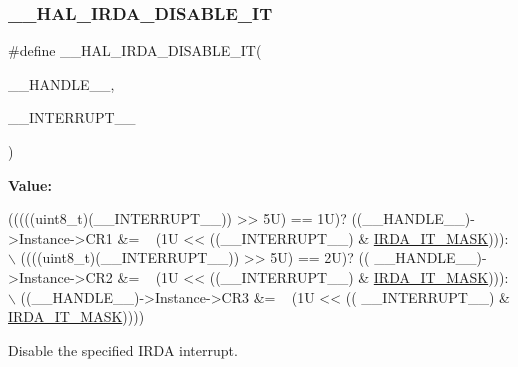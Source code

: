 \subsubsection{\texorpdfstring{\+\_\+\+\_\+\+H\+A\+L\+\_\+\+I\+R\+D\+A\+\_\+\+D\+I\+S\+A\+B\+L\+E\+\_\+\+IT}{\_\_HAL\_IRDA\_DISABLE\_IT}}
{\footnotesize\ttfamily \#define \+\_\+\+\_\+\+H\+A\+L\+\_\+\+I\+R\+D\+A\+\_\+\+D\+I\+S\+A\+B\+L\+E\+\_\+\+IT(\begin{DoxyParamCaption}\item[{}]{\+\_\+\+\_\+\+H\+A\+N\+D\+L\+E\+\_\+\+\_\+,  }\item[{}]{\+\_\+\+\_\+\+I\+N\+T\+E\+R\+R\+U\+P\+T\+\_\+\+\_\+ }\end{DoxyParamCaption})}

{\bfseries Value\+:}
\begin{DoxyCode}
(((((uint8\_t)(\_\_INTERRUPT\_\_)) >> 5U) == 1U)? ((\_\_HANDLE\_\_)->Instance->CR1 &= ~ (1U << ((\_\_INTERRUPT\_\_) & 
      \hyperlink{group___i_r_d_a___interruption___mask_ga38eeb904e4117f70c18bf3767c7ba4a6}{IRDA\_IT\_MASK}))): \(\backslash\)
                                                           ((((uint8\_t)(\_\_INTERRUPT\_\_)) >> 5U) == 2U)? ((
      \_\_HANDLE\_\_)->Instance->CR2 &= ~ (1U << ((\_\_INTERRUPT\_\_) & \hyperlink{group___i_r_d_a___interruption___mask_ga38eeb904e4117f70c18bf3767c7ba4a6}{IRDA\_IT\_MASK}))): \(\backslash\)
                                                           ((\_\_HANDLE\_\_)->Instance->CR3 &= ~ (1U << ((
      \_\_INTERRUPT\_\_) & \hyperlink{group___i_r_d_a___interruption___mask_ga38eeb904e4117f70c18bf3767c7ba4a6}{IRDA\_IT\_MASK}))))
\end{DoxyCode}


Disable the specified I\+R\+DA interrupt. 


